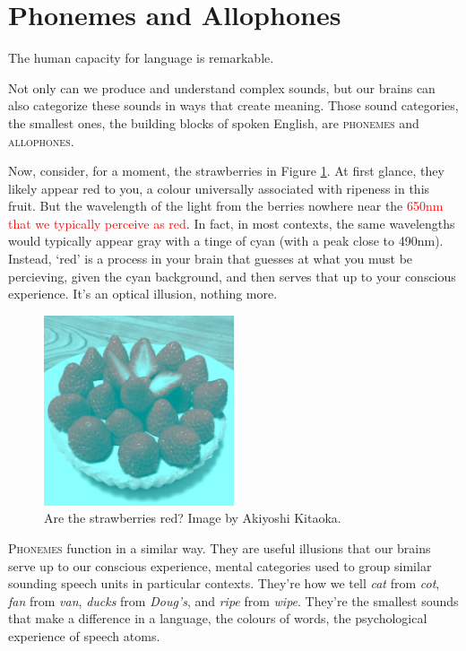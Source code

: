 \section{Phonemes and Allophones} \label{sec:allophones}

The human capacity for language is remarkable.

Not only can we produce and understand complex sounds, but our brains can also categorize these sounds in ways that create meaning. Those sound categories, the smallest ones, the building blocks of spoken English, are \textsc{phonemes} and \textsc{allophones}.

Now, consider, for a moment, the strawberries in Figure \ref{fig:strawberries}. At first glance, they likely appear red to you, a colour universally associated with ripeness in this fruit. But the wavelength of the light from the berries nowhere near the \textcolor{red}{650nm that we typically perceive as red}. In fact, in most contexts, the same wavelengths would typically appear gray with a tinge of cyan (with a peak close to 490nm). Instead, `red' is a process in your brain that guesses at what you must be percieving, given the cyan background, and then serves that up to your conscious experience. It's an optical illusion, nothing more.

\begin{figure}[ht]
    \centering
    \includegraphics[width=0.5\textwidth]{figures/strawberries.jpg}
    \caption{Are the strawberries red? Image by Akiyoshi Kitaoka.}
    \label{fig:strawberries}
\end{figure}

\textsc{Phonemes} function in a similar way. They are useful illusions that our brains serve up to our conscious experience, mental categories used to group similar sounding speech units in particular contexts. They're how we tell \textit{cat} from \textit{cot}, \textit{fan} from \textit{van}, \textit{ducks} from \textit{Doug's}, and \textit{ripe} from \textit{wipe}. They're the smallest sounds that make a difference in a language, the colours of words, the psychological experience of speech atoms.

